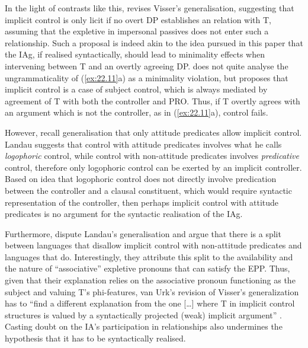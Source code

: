 \documentclass[output=paper]{langsci/langscibook}
\begin{document}
In the light of contrasts like this, \textcite{vanUrk2013} revises Visser’s
generalisation, suggesting that implicit control
is only licit if no overt DP establishes an  relation with T,
assuming that the expletive in impersonal passives does not
enter such a relationship. Such a proposal is indeed akin to the idea pursued
in this paper that the \gls{IAg}, if realised
syntactically, should lead to minimality effects when intervening between T and
an overtly agreeing DP. \Textcite{vanUrk2013} does not quite analyse the
ungrammaticality of (\ref{ex:22.11}a) as a minimality violation, but
proposes that implicit control is a case of subject control, which is always
mediated by agreement of T with both the controller and PRO. Thus, if T overtly
agrees with an argument which is not the controller, as in
(\ref{ex:22.11}a), control fails.

However, recall  generalisation that only attitude
predicates allow implicit control. Landau suggests that control with attitude
predicates involves what he calls \emph{logophoric} control, while control with
non-attitude predicates involves \emph{predicative} control, therefore only
logophoric control can be exerted by an implicit controller. Based on
 idea that logophoric control does not directly involve
predication between the controller and a clausal constituent, which would
require syntactic representation of the controller, then perhaps implicit
control with attitude predicates is no argument for the syntactic realisation
of the \gls{IAg}.

Furthermore, \citet{PitteroffSchafer2017} dispute Landau’s generalisation and
argue that there is a split between languages that disallow implicit control
with non-attitude predicates and languages that do. Interestingly, they
attribute this split to the availability and the nature of
\enquote{associative} expletive pronouns that can satisfy the
\gls{EPP}. Thus, given that their explanation relies on the
associative pronoun functioning as the subject and valuing T’s phi-features,
van Urk’s revision of Visser’s generalization has to “find a different
explanation from the one [\dots{}] where T in implicit control structures is
valued by a syntactically projected (weak) implicit argument”
\parencite[38--39]{PitteroffSchafer2017}. Casting doubt on the IA’s
participation in  relationships also undermines the hypothesis that it has
to be syntactically realised.
\end{document}
